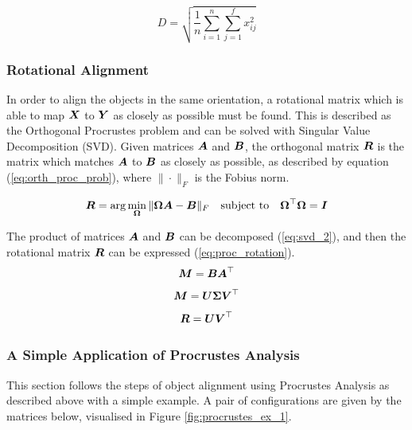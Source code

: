 \documentclass[12pt]{report}
\begin{document}
\begin{equation}
    \label{eq:rms}
    D = \sqrt{\frac{1}{n} \sum_{i=1}^{n} \sum_{j=1}^{f} x_{ij}^2}
\end{equation}

\subsubsection{Rotational Alignment} \label{sec:rot_align}
In order to align the objects in the same orientation, a rotational matrix which is able to map ${\boldsymbol{{X}}}$ to ${\boldsymbol{{Y}}}$ as closely as possible must be found.
This is described as the Orthogonal Procrustes problem and can be solved with Singular Value Decomposition (SVD).
Given matrices ${\boldsymbol{{A}}}$ and ${\boldsymbol{{B}}}$, the orthogonal matrix ${\boldsymbol{{R}}}$ is the matrix which matches ${\boldsymbol{{A}}}$ to ${\boldsymbol{{B}}}$ as closely as possible, as described by equation (\ref{eq:orth_proc_prob}), where $\| \cdot \|_F$ is the Fobius norm.

\begin{equation}
    \label{eq:orth_proc_prob}
    {\boldsymbol{{R}}} =\operatorname*{arg}\operatorname*{min}_{\boldsymbol{{\Omega}}} 
        \| {\boldsymbol{{\Omega}}} {\boldsymbol{{A}}} - {\boldsymbol{{B}}} \|_F
        \quad
        \text{subject to}
        \quad
        {\boldsymbol{{\Omega}}}^\top {\boldsymbol{{\Omega}}} = {\boldsymbol{{I}}}
\end{equation}

The product of matrices ${\boldsymbol{{A}}}$ and ${\boldsymbol{{B}}}$ can be decomposed (\ref{eq:svd_2}), and then the rotational matrix ${\boldsymbol{{R}}}$ can be expressed (\ref{eq:proc_rotation}).
\begin{equation} \label{eq:svd_1}
    {\boldsymbol{{M}}} = {\boldsymbol{{B}}} {\boldsymbol{{A}}}^\top
\end{equation}
\begin{equation} \label{eq:svd_2}
    {\boldsymbol{{M}}} = {\boldsymbol{{U}}} {\boldsymbol{{\Sigma}}} {\boldsymbol{{V}}}^\top
\end{equation}
\begin{equation} \label{eq:proc_rotation}
    {\boldsymbol{{R}}} = {\boldsymbol{{U}}} {\boldsymbol{{V}}}^\top
\end{equation}

\subsubsection{A Simple Application of Procrustes Analysis}
This section follows the steps of object alignment using Procrustes Analysis as described above with a simple example.
A pair of configurations are given by the matrices below, visualised in Figure \ref{fig:procrustes_ex_1}.
\end{document}

